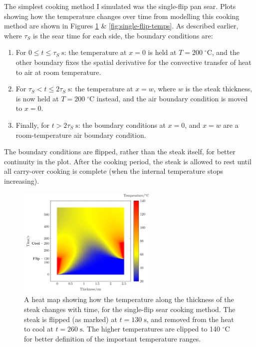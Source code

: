 \documentclass[11pt]{article}
\begin{document}
	The simplest cooking method I simulated was the single-flip pan sear. Plots showing how the temperature changes over time from modelling this cooking method are shown in Figures \ref{fig:single-flip-heatmap} \& \ref{fig:single-flip-temps}. As described earlier, where $\tau_S$ is the sear time for each side, the boundary conditions are:
	\begin{enumerate}
		\item For $0 \leq t \leq \tau_S\;\mathrm{s}$: the temperature at $x=0$ is held at $T = 200\;^\circ\mathrm{C}$, and the other boundary fixes the spatial derivative for the convective transfer of heat to air at room temperature.
		\item For $\tau_S < t \leq 2\tau_S\;\mathrm{s}$: the temperature at $x=w$, where $w$ is the steak thickness, is now held at $T= 200\;^\circ\mathrm{C}$ instead, and the air boundary condition is moved to $x=0$.
		\item Finally, for $t > 2\tau_S\;\mathrm{s}$: the boundary conditions at $x=0$, and $x=w$ are a room-temperature air boundary condition.
	\end{enumerate}
	
	The boundary conditions are flipped, rather than the steak itself, for better continuity in the plot. After the cooking period, the steak is allowed to rest until all carry-over cooking is complete (when the internal temperature stops increasing).
	
	\begin{figure}[H]
		\centering
		\includegraphics[width=0.6\textwidth]{./img/single-flip-heatmap.png}
		\caption{A heat map showing how the temperature along the thickness of the steak changes with time, for the single-flip sear cooking method. The steak is flipped (as marked) at $t=130\;\mathrm{s}$, and removed from the heat to cool at $t=260\;\mathrm{s}$. The higher temperatures are clipped to 140 $^\circ\text{C}$ for better definition of the important temperature ranges.}
		\label{fig:single-flip-heatmap}
	\end{figure}
	
\end{document}
